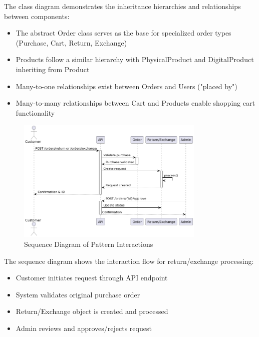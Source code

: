 \documentclass[12pt,a4paper]{article}
\begin{document}
The class diagram demonstrates the inheritance hierarchies and relationships between components:
\begin{itemize}
    \item The abstract Order class serves as the base for specialized order types (Purchase, Cart, Return, Exchange)
    \item Products follow a similar hierarchy with PhysicalProduct and DigitalProduct inheriting from Product
    \item Many-to-one relationships exist between Orders and Users ("placed by")
    \item Many-to-many relationships between Cart and Products enable shopping cart functionality
\end{itemize}

\begin{figure}[H]
    \centering
    \includegraphics[width=0.8\textwidth]{UML diagrams/sequence_diagram.png}
    \caption{Sequence Diagram of Pattern Interactions}
\end{figure}

The sequence diagram shows the interaction flow for return/exchange processing:
\begin{itemize}
    \item Customer initiates request through API endpoint
    \item System validates original purchase order
    \item Return/Exchange object is created and processed
    \item Admin reviews and approves/rejects request
\end{itemize}
\end{document}
